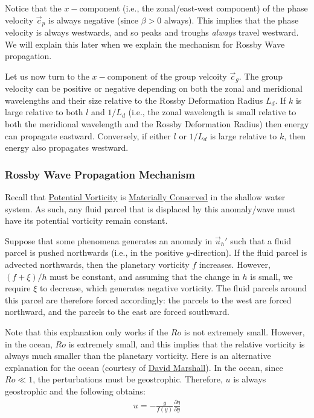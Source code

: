 Notice that the $x-$component (i.e., the zonal/east-west component) of the phase velocity $\vec{c}_p$ is always negative (since $\beta>0$ always). This implies that the phase velocity is always westwards, and so peaks and troughs \textit{always} travel westward. We will explain this later when we explain the mechanism for Rossby Wave propagation.

Let us now turn to the $x-$component of the group velcoity $\vec{c}_g$. The group velocity can be positive or negative depending on both the zonal and meridional wavelengths and their size relative to the Rossby Deformation Radius $L_d$. If $k$ is large relative to both $l$ and $1/L_d$ (i.e., the zonal wavelength is small relative to both the meridional wavelength and the Rossby Deformation Radius) then energy can propagate eastward. Conversely, if either $l$ or $1/L_d$ is large relative to $k$, then energy also propagates westward.

\subsubsection{Rossby Wave Propagation Mechanism}

Recall that \hyperref[PV]{Potential Vorticity} is \hyperref[Cons PV Box]{Materially Conserved} in the shallow water system. As such, any fluid parcel that is displaced by this anomaly/wave must have its potential vorticity remain constant.

Suppose that some phenomena generates an anomaly in $\vec{u}_h'$ such that a fluid parcel is pushed northwards (i.e., in the positive $y$-direction). If the fluid parcel is advected northwards, then the planetary vorticity $f$ increases. However, $(f+\xi)/h$ must be constant, and assuming that the change in $h$ is small, we require $\xi$ to decrease, which generates negative vorticity. The fluid parcels around this parcel are therefore forced accordingly: the parcels to the west are forced northward, and the parcels to the east are forced southward.

Note that this explanation only works if the $Ro$ is not extremely small. However, in the ocean, $Ro$ is extremely small, and this implies that the relative vorticity is always much smaller than the planetary vorticity. Here is an alternative explanation for the ocean (courtesy of \href{https://www.physics.ox.ac.uk/our-people/marshalld}{David Marshall}). In the ocean, since $Ro\ll 1$, the perturbations must be geostrophic. Therefore, $u$ is always geostrophic and the following obtains:
\begin{align*}
    u = - \frac{g}{f(y)}\frac{\partial \eta}{\partial y}
\end{align*}

